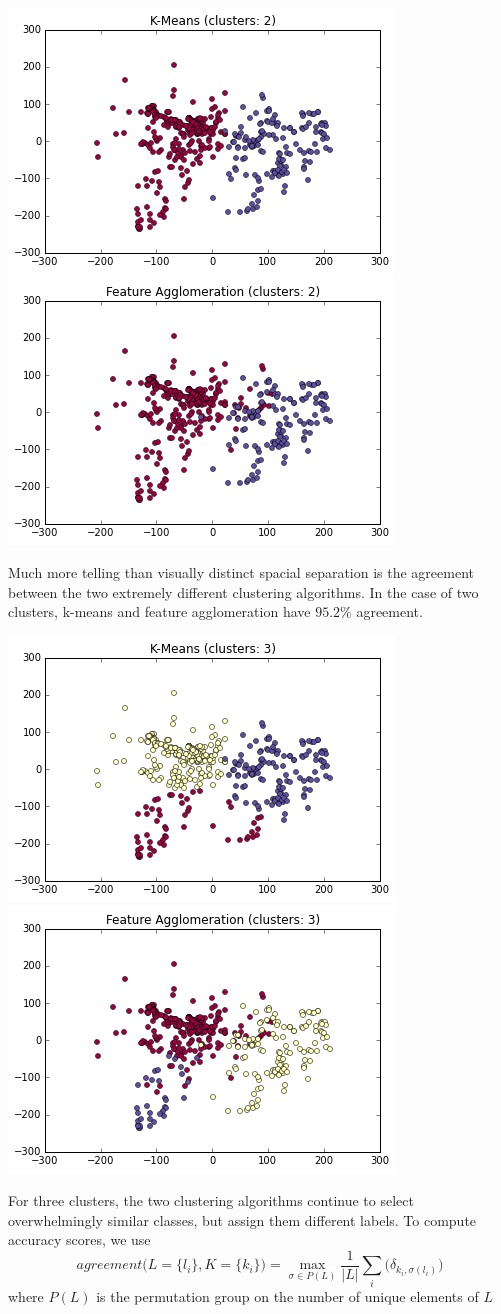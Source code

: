 \documentclass[paper.tex]{subfiles}
\begin{document}
	\includegraphics[width=0.5\linewidth]{images/clusters_km_2.png}
	\includegraphics[width=0.5\linewidth]{images/clusters_fa_2.png}
	
	Much more telling than visually distinct spacial separation is the agreement between the two extremely different clustering algorithms. In the case of two clusters, k-means and feature agglomeration have $95.2\%$ agreement.

	\includegraphics[width=0.5\linewidth]{images/clusters_km_3.png}
	\includegraphics[width=0.5\linewidth]{images/clusters_fa_3.png}
	
	For three clusters, the two clustering algorithms continue to select overwhelmingly similar classes, but assign them different labels. To compute accuracy scores, we use 
	\[ agreement\Big(L = \{l_i\}, K = \{k_i\} \Big) =  \max_{\sigma \in P(L)} \frac{1}{|L|} \sum_i  \Big(\delta_{k_i, \sigma(l_i)} \Big) \]
	where $P(L)$ is the permutation group on the number of unique elements of $L$ 
	
\end{document}
